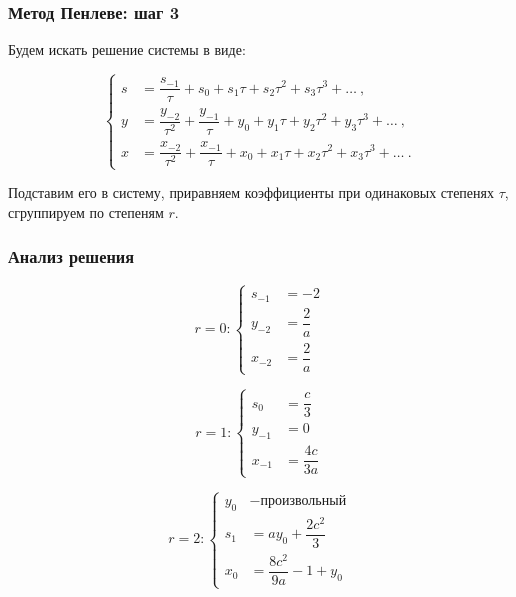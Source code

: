 \documentclass[hyperref={pdftex,unicode}]{beamer}
\begin{document}
\begin{frame}

\frametitle{Метод Пенлеве: шаг 3}

Будем искать решение системы в виде:

$$
        \left\{
                \begin{aligned}
                        s &= \dfrac{s_{-1}}{\tau} + s_0 + s_1\tau + s_2\tau^2 + s_3\tau^3 + \ldots ~,  \\
                        y &= \dfrac{y_{-2}}{\tau^2} + \dfrac{y_{-1}}{\tau} + y_0 + y_1\tau + y_2\tau^2 + y_3\tau^3 + \ldots ~, \\
                        x &= \dfrac{x_{-2}}{\tau^2} + \dfrac{x_{-1}}{\tau} + x_0 + x_1\tau + x_2\tau^2 + x_3\tau^3 + \ldots ~.
                \end{aligned}
        \right.
$$

\vspace{20pt}

Подставим его в систему, приравняем коэффициенты при одинаковых степенях $ \tau $, сгруппируем по степеням $ r $.


\end{frame}



\begin{frame}

\frametitle{Анализ решения}
\begin{minipage}[H]{0.4\linewidth}

$$
r = 0:
\left\{
	\begin{aligned}
		s_{-1} &= -2 \\
		y_{-2} &= \dfrac{2}{a} \\
		x_{-2} &= \dfrac{2}{a}
	\end{aligned}
\right.
$$

\end{minipage}
\hfill
\begin{minipage}[H]{0.4\linewidth}

$$
r = 1:
\left\{
	\begin{aligned}
		s_{0} &= \dfrac{c}{3} \\
		y_{-1} &= 0 \\
		x_{-1} &= \dfrac{4c}{3a}
	\end{aligned}
\right.
$$

\end{minipage}

\vspace{20pt}

$$
r = 2:
\left\{
	\begin{aligned}
		y_{0} &- \text{произвольный} \\
		s_{1} &= ay_0 + \dfrac{2c^2}{3} \\
		x_{0} &= \dfrac{8c^2}{9a} - 1 + y_0
	\end{aligned}
\right.
$$

\end{frame}
\end{document}
